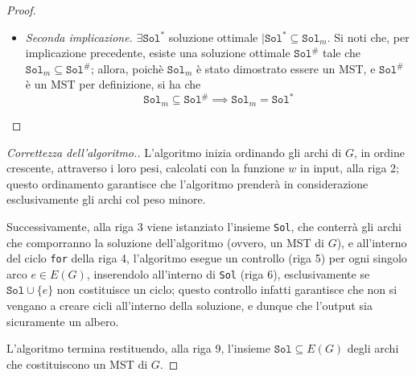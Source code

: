\documentclass[a4paper, 12pt]{report}
\begin{document}
\begin{proof}
\begin{itemize}
\begin{itemize}
                    \item si noti che, considerando l'insieme di archi $(\texttt{Sol}^* \cup \{e_{k +1}\}) - \{e_j\}$, il vertice $y$ resta coperto
                    \item si noti che l'arco $e_j$ non è in $\texttt{Sol}_{k +1}$, e dunque $k + 1 < j$; allora, per via dell'ordinamento degli archi alla riga $2$, necessariamente $w(e_{k +1}) \le w(e_j)$; dunque, si ha che $$\displaystyle \sum_{e \in ((\texttt{Sol}^* \cup \{e_{k +1}\}) - \{e_j\})}{w(e)} \le \sum_{e \in \texttt{Sol}^*}{w(e)}$$ ma poiché $\texttt{Sol}^*$, per definizione, è soluzione ottimale, non è possibile trovare una soluzione con peso inferiore, e dunque necessariamente $$(\texttt{Sol}^* \cup \{e_{k +1}\}) - \{e_j\}$$ ha lo stesso peso di $\texttt{Sol}^*$, che costituisce un MST di $G$; allora, tale insieme di archi è una soluzione ottimale, contenente $\texttt{Sol}_{k +1}$ per definizione.
                \end{itemize}
            \item[] \textit{Seconda implicazione.} $\exists \texttt{Sol}^*$ soluzione ottimale $\mid \texttt{Sol}^* \subseteq \texttt{Sol}_m$. Si noti che, per implicazione precedente, esiste una soluzione ottimale $\texttt{Sol}^\#$ tale che $\texttt{Sol}_m \subseteq \texttt{Sol}^\#$; allora, poichè $\texttt{Sol}_m$ è stato dimostrato essere un MST, e $\texttt{Sol}^\#$ è un MST per definizione, si ha che $$\texttt{Sol}_m \subseteq \texttt{Sol}^\# \implies \texttt{Sol}_m = \texttt{Sol}^*$$
        \end{itemize}
    \end{proof}

    \begin{proof}[Correttezza dell'algoritmo.]
        L'algoritmo inizia ordinando gli archi di $G$, in ordine crescente, attraverso i loro pesi, calcolati con la funzione $w$ in input, alla riga 2; questo ordinamento garantisce che l'algoritmo prenderà in considerazione esclusivamente gli archi col peso minore.

        Successivamente, alla riga 3 viene istanziato l'insieme \texttt{Sol}, che conterrà gli archi che comporranno la soluzione dell'algoritmo (ovvero, un MST di $G$), e all'interno del ciclo \texttt{for} della riga 4, l'algoritmo esegue un controllo (riga 5) per ogni singolo arco $e \in E(G)$, inserendolo all'interno di \texttt{Sol} (riga 6), esclusivamente se $\texttt{Sol} \cup \{e\}$ non costituisce un ciclo; questo controllo infatti garantisce che non si vengano a creare cicli all'interno della soluzione, e dunque che l'output sia sicuramente un albero.

        L'algoritmo termina restituendo, alla riga 9, l'insieme $\texttt{Sol} \subseteq E(G)$ degli archi che costituiscono un MST di $G$.
    \end{proof}
\end{document}

